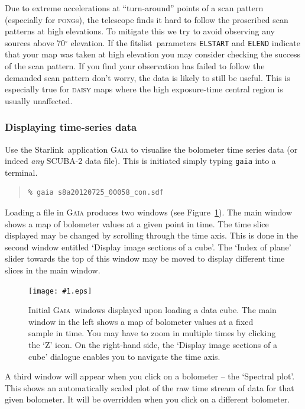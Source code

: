 \documentclass[twoside,11pt]{article}
\newcommand{\htmladdnormallink}[2]{#1}
\newcommand{\htmladdimg}[1]{}
\newcommand{\htmlref}[2]{#1}
\newcommand{\latexhtml}[2]{#1}
\newcommand{\xref}[3]{#1}
\newcommand{\xlabel}[1]{}
\renewcommand{\_}{\texttt{\symbol{95}}}
\newenvironment{myquote}{\begin{quote}\begin{small}}{\end{small}\end{quote}}
\newcommand{\starlink}{\htmladdnormallink{Starlink}{http://starlink.jach.hawaii.edu}}
\newcommand{\gaia}{\xref{\textsc{Gaia}}{sun214}{}}
\newcommand{\task}[1]{\textsf{#1}}
\newcommand{\param}[1]{\texttt{#1}}
\newcommand{\fitslist}{\xref{\task{fitslist}}{sun95}{FITSLIST}}
\newcommand{\myfig}[5]{
  \begin{figure}#2
    \centering\texttt{[image: \#1.eps]}
    \typeout{#1.eps inserted on page \arabic{page}}
    \caption{\label{#4}\small #5}
  \end{figure}
}
\newcommand{\myfig}[5]{
    \label{#4} \htmladdimg{#1.png}\\
    \\
    Figure: #5\\
  }
\newcommand{\cref}[3]{\latexhtml{#1~\ref{#2}}{\htmlref{#3}{#2}}}
\begin{document}
Due to extreme accelerations at ``turn-around'' points of a scan
pattern (especially for \textsc{pong}s), the telescope finds it hard
to follow the proscribed scan patterns at high elevations. To mitigate
this we try to avoid observing any sources above 70$^\circ$ elevation.
If the \fitslist\ parameters \param{ELSTART} and \param{ELEND}
indicate that your map was taken at high elevation you may consider
checking the success of the scan pattern. If you find your observation
has failed to follow the demanded scan pattern don't worry, the data is
likely to still be useful. This is especially true for \textsc{daisy}
maps where the high exposure-time central region is usually
unaffected.

\subsubsection{\xlabel{display_cube}Displaying time-series data}
\label{sec:gaiacube}

Use the \starlink\ application \textsc{Gaia} to visualise the bolometer time
series data (or indeed \emph{any} SCUBA-2 data file). This is
initiated simply typing \texttt{gaia} into a terminal.

\begin{myquote}
\begin{verbatim}
% gaia s8a20120725_00058_con.sdf
\end{verbatim}
\end{myquote}

Loading a file in \textsc{Gaia} produces two windows (see
\cref{Figure}{fig:gaia_main}{upper graphic}). The main window shows a map of bolometer
values at a given point in time. The time slice displayed may be
changed by scrolling through the time axis. This is done in the second
window entitled `Display image sections of a cube'. The `Index of
plane' slider towards the top of this window may be moved to display
different time slices in the main window.

\myfig{sc21_gaia1}{[h!]}{width=\linewidth}{fig:gaia_main}{
  Initial \gaia\ windows displayed upon loading a data cube.
  The main window in the left shows a map of bolometer values at a fixed
  sample in time. You may have to zoom in multiple times by clicking the
  `Z' icon. On the right-hand side, the `Display image sections of a cube'
  dialogue enables you to navigate the time axis.}

A third window will appear when you click on a bolometer -- the
`Spectral plot'. This shows an automatically scaled plot of the raw
time stream of data for that given bolometer. It will be overridden
when you click on a different bolometer.
\end{document}
